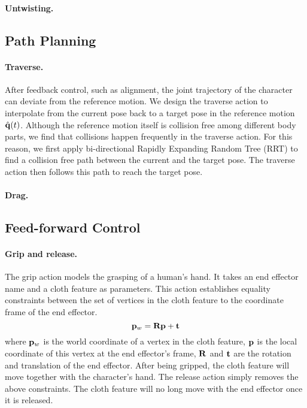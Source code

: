 \paragraph{Untwisting.}

\subsection{Path Planning}
\paragraph{Traverse.} After feedback control, such as alignment, the joint trajectory of the character can deviate from the reference motion. We design the traverse action to interpolate from the current pose back to a target pose in the reference motion $\hat{\mathbf{q}}(t)$. Although the reference motion itself is collision free among different body parts, we find that collisions happen frequently in the traverse action. For this reason, we first apply bi-directional Rapidly Expanding Random Tree (RRT) \cite{} to find a collision free path between the current and the target pose. The traverse action then follows this path to reach the target pose.

\paragraph{Drag.}

\subsection{Feed-forward Control}

\paragraph{Grip and release.}
The grip action models the grasping of a human's hand. It takes an end effector name and a cloth feature as parameters. This action establishes equality constraints between the set of vertices in the cloth feature to the coordinate frame of the end effector.
\begin{displaymath}
\mathbf{p}_w = \mathbf{Rp} + \mathbf{t}
\end{displaymath}
where $\mathbf{p}_w$ is the world coordinate of a vertex in the cloth feature, $\mathbf{p}$ is the local coordinate of this vertex at the end effector's frame, $\mathbf{R}$ and $\mathbf{t}$ are the rotation and translation of the end effector. After being gripped, the cloth feature will move together with the character's hand. The release action simply removes the above constraints. The cloth feature will no long move with the end effector once it is released.

